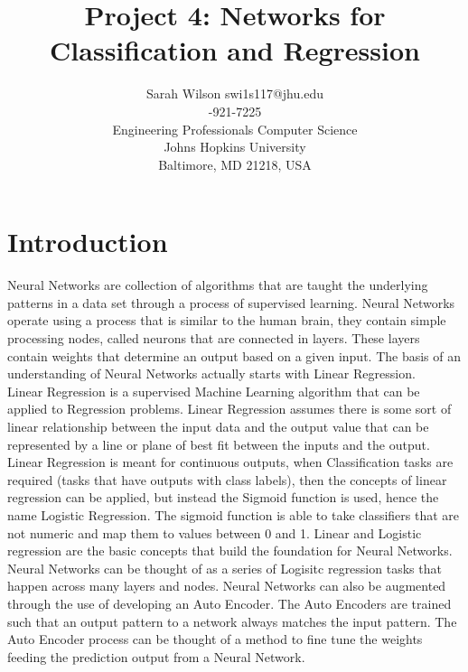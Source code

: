 \documentclass[twoside,11pt]{article}
\begin{document}
\title{Project 4: Networks for Classification and Regression}

\author{\name Sarah Wilson 
	   \email swi1s117@jhu.edu \\
	   -921-7225 \\
       \addr Engineering Professionals Computer Science\\
       Johns Hopkins University\\
       Baltimore, MD 21218, USA} 

\maketitle


\section{Introduction}
\hspace*{10mm} Neural Networks are collection of algorithms that are taught the underlying patterns in a data set through a process of supervised learning. Neural Networks operate using a process that is similar to the human brain, they contain simple processing nodes, called neurons that are connected in layers. These layers contain weights that determine an output based on a given input. The basis of an understanding of Neural Networks actually starts with Linear Regression.\\ 
\hspace*{10mm} Linear Regression is a supervised Machine Learning algorithm that can be applied to Regression problems. Linear Regression assumes there is some sort of linear relationship between the input data and the output value that can be represented by a line or plane of best fit between the inputs and the output. Linear Regression is meant for continuous outputs, when Classification tasks are required (tasks that have outputs with class labels), then the concepts of linear regression can be applied, but instead the Sigmoid function is used, hence the name Logistic Regression. The sigmoid function is able to take classifiers that are not numeric and map them to values between 0 and 1. Linear and Logistic regression are the basic concepts that build the foundation for Neural Networks. Neural Networks can be thought of as a series of Logisitc regression tasks that happen across many layers and nodes. Neural Networks can also be augmented through the use of developing an Auto Encoder. The Auto Encoders are trained such that an output pattern to a network always matches the input pattern. The Auto Encoder process can be thought of a method to fine tune the weights feeding the prediction output from a Neural Network.\\
\end{document}
